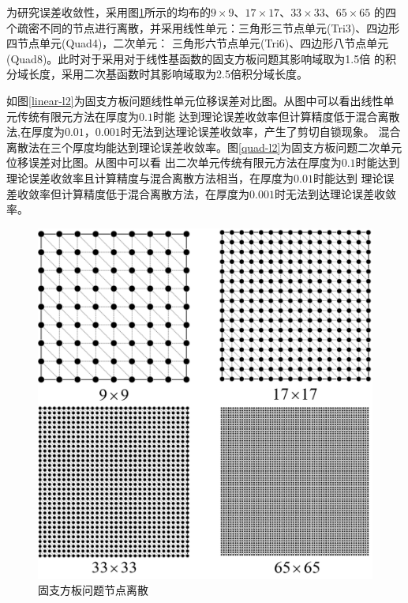 为研究误差收敛性，采用图\ref{platemsh}所示的均布的$9\times 9$、$17\times 17$、$33\times 33$、$65\times 65$
的四个疏密不同的节点进行离散，并采用线性单元：三角形三节点单元(Tri3)、四边形四节点单元(Quad4)，二次单元：
三角形六节点单元(Tri6)、四边形八节点单元(Quad8)。此时对于采用对于线性基函数的固支方板问题其影响域取为1.5倍
的积分域长度，采用二次基函数时其影响域取为2.5倍积分域长度。

如图\ref{linear-l2}为固支方板问题线性单元位移误差对比图。从图中可以看出线性单元传统有限元方法在厚度为$0.1$时能
达到理论误差收敛率但计算精度低于混合离散法,在厚度为$0.01$，$0.001$时无法到达理论误差收敛率，产生了剪切自锁现象。
混合离散法在三个厚度均能达到理论误差收敛率。图\ref{quad-l2}为固支方板问题二次单元位移误差对比图。从图中可以看
出二次单元传统有限元方法在厚度为$0.1$时能达到理论误差收敛率且计算精度与混合离散方法相当，在厚度为$0.01$时能达到
理论误差收敛率但计算精度低于混合离散方法，在厚度为$0.001$时无法到达理论误差收敛率。
\begin{figure}[H]
    \centering 
    \includegraphics[scale=0.5]{figures/shearlocking/platemsh.png}
    \caption{固支方板问题节点离散}\label{platemsh}
\end{figure}
